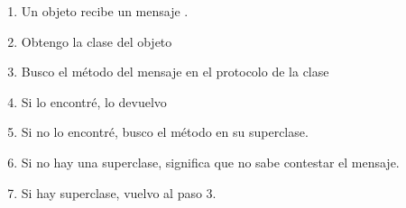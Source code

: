 \begin{enumerate}\itemsep-0.3em
 \item Un objeto  recibe un mensaje .
 
 
 \item Obtengo la clase del objeto
 
  
 \item Busco el m\'etodo del mensaje  en el protocolo de la clase
 
  
 \item Si lo encontr\'e, lo devuelvo
 
  
 \item Si no lo encontr\'e, busco el m\'etodo en su superclase. 
 
  
 \item Si no hay una superclase, significa que no sabe contestar el mensaje.
  
  
 \item Si hay superclase, vuelvo al paso 3. 
 
\end{enumerate}
